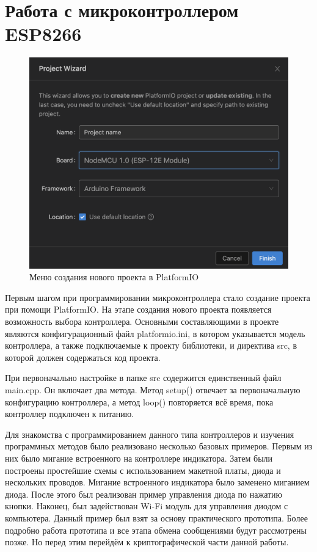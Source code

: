 	
	\section{Работа с микроконтроллером ESP8266}
	
	\begin{figure}[h]
		\centering
		\includegraphics[scale=0.6]{resources/platformio-new-project}
		\caption{Меню создания нового проекта в PlatformIO}
		\label{fig4.1}
	\end{figure}
	
	Первым шагом при программировании микроконтроллера стало создание проекта при помощи PlatformIO.
	На этапе создания нового проекта появляется возможность выбора контроллера. Основными составляющими
	в проекте являются конфигурационный файл platformio.ini, в котором указывается модель контроллера,
	а также подключаемые к проекту библиотеки, и директива src, в которой должен содержаться код проекта.
	
	При первоначально настройке в папке src содержится единственный файл main.cpp. Он включает два
	метода. Метод setup() отвечает за первоначальную конфигурацию контроллера, а метод loop()
	повторяется всё время, пока контроллер подключен к питанию.
	
	Для знакомства с программированием данного типа контроллеров и изучения программных методов
	было реализовано несколько базовых примеров. Первым из них было мигание встроенного на контроллере
	индикатора. Затем были построены простейшие схемы с использованием макетной платы, диода и
	нескольких проводов. Мигание встроенного индикатора было заменено миганием диода. После этого
	был реализован пример управления диода по нажатию кнопки. Наконец, был задействован Wi-Fi модуль
	для управления диодом с компьютера. Данный пример был взят за основу практического прототипа. Более
	подробно работа прототипа и все этапа обмена сообщениями будут рассмотрены позже. Но перед этим
	перейдём к криптографической части данной работы.
	
